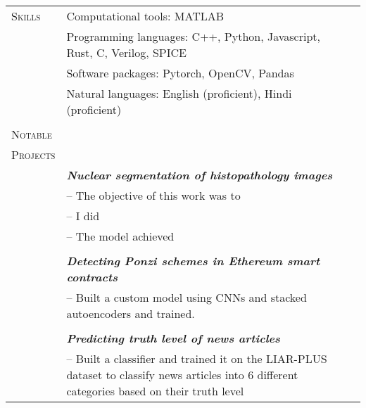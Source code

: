 \documentclass[letterpaper, 10pt, oneside]{article}
\newcommand{\stitle}[1]{\normalsize{\textsc{#1}}}
\newcommand{\bdit}[1]{\textit{\textbf{#1}}}
\begin{document}
\begin{tabular}{@{} l l l}
\stitle{Skills} & Computational tools: MATLAB \\
                & Programming languages: C++, Python, Javascript, Rust, C, Verilog, SPICE \\
                & Software packages: Pytorch, OpenCV, Pandas \\
                & Natural languages: English (proficient), Hindi (proficient) \\
\\

\stitle{Notable}  &  \\ 
\stitle{Projects} &  \\ 
                   
                  & \bdit{Nuclear segmentation of histopathology images} \\
                  & -- The objective of this work was to  \\
                  & -- I did  \\
                  & -- The model achieved \\
\\
                  & \bdit{Detecting Ponzi schemes in Ethereum smart contracts} \\
                  & -- Built a custom model using CNNs and stacked autoencoders and trained.\\ 
\\
                  & \bdit{Predicting truth level of news articles} \\ 
                  & -- Built a classifier and trained it on the LIAR-PLUS dataset to classify news articles into 6 different categories
                  based on their truth level
\\




\end{tabular}
\end{document}
